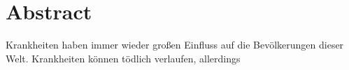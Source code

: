 \section*{Abstract}
Krankheiten haben immer wieder großen Einfluss auf die Bevölkerungen dieser Welt. Krankheiten können tödlich verlaufen, allerdings 